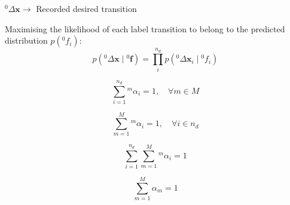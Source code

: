 \( {}^{0}\Delta \boldsymbol{x} \to \) Recorded desired transition

Maximising the likelihood of each label transition to belong to the predicted distribution \( p \left( {}^{0}f_i \right) \):
\begin{equation}
    p \left( {}^{0}\Delta \boldsymbol{x} \mid {}^{0}\boldsymbol{f} \right)
    =
    \prod_{i}^{n_d} p \left( {}^{0}\Delta \boldsymbol{x}_i \mid {}^{0}f_i \right)
\end{equation}

\begin{equation}
    \sum_{i = 1}^{n_d} {}^{m} \alpha_{i} = 1, \quad \forall m \in M
\end{equation}

\begin{equation}
    \sum_{m = 1}^{M} {}^{m} \alpha_{i} = 1, \quad \forall i \in n_d
\end{equation}

\begin{equation}
    \sum_{i = 1}^{n_d} \sum_{m = 1}^{M} {}^{m} \alpha_{i} = 1
\end{equation}

\begin{equation}
    \sum_{m = 1}^{M} \alpha_{m} = 1
\end{equation}
